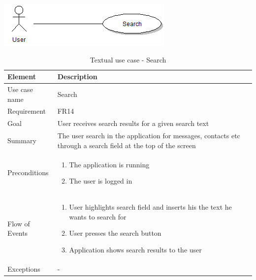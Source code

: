 \begin{table}
\begin{center}
\begin{center}
\includegraphics[width=\textwidth]{search}
\end{center}
\begin{tabular}{p{3cm}|p{12cm}} \hline
\textbf{Element} & \textbf{Description} \\ \hline \hline
Use case name & Search \\
Requirement & FR14 \\
Goal & User receives search results for a given search text \\ \hline
Summary & The user search in the application for messages, contacts etc through a search field at the top of the screen \\ \hline
Preconditions &
\begin{enumerate}
\item{}The application is running
\item{}The user is logged in
\end{enumerate} \\ \hline
Flow of Events &
\begin{enumerate}
\item{}User highlights search field and inserts his the text he wants to search for
\item{}User presses the search button
\item{}Application shows search results to the user
\end{enumerate}\\ \hline
Exceptions & - \\ \hline
\end{tabular}
\end{center}
\caption{Textual use case - Search} \label{tab:search}
\end{table}
